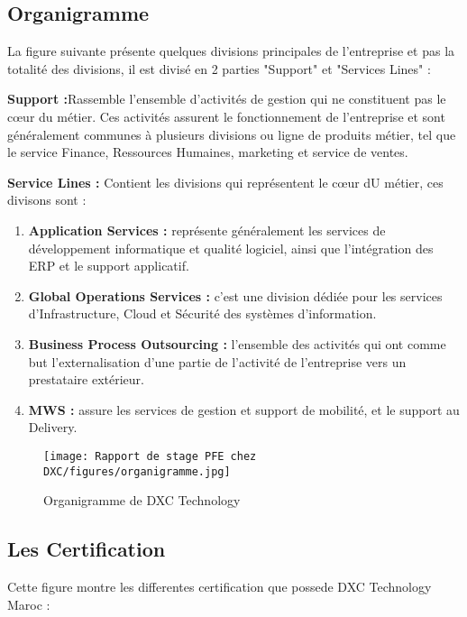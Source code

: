 \newpage
\subsection{Organigramme }
La figure suivante présente quelques divisions principales de l’entreprise et pas la totalité
des divisions, il est divisé en 2 parties "Support" et "Services Lines" :

\begin{description}
  \item \textbf{Support :}Rassemble l’ensemble d'activités de gestion qui ne constituent pas le cœur du métier. Ces activités assurent le fonctionnement de l'entreprise et sont généralement communes à plusieurs divisions ou ligne de produits métier, tel que le service Finance, Ressources Humaines, marketing et service de ventes.
  \item \textbf{Service Lines :} Contient les divisions qui représentent le cœur dU métier, ces divisons
 sont :
 \begin{enumerate}
   \item \textbf{Application Services :} représente généralement les services de développement informatique et qualité logiciel, ainsi que l’intégration des ERP et le support applicatif.
   \item \textbf{Global Operations Services :} c’est une division dédiée pour les services d’Infrastructure, Cloud et Sécurité des systèmes d’information.
   \item \textbf{Business Process Outsourcing : } l’ensemble des activités qui ont comme but l'externalisation d'une partie de l'activité de l'entreprise vers un prestataire extérieur.
    \item \textbf{MWS  : } assure les services de gestion et support de mobilité, et le support au Delivery.
 \end{enumerate}
  
  \begin{figure}[!h]
    \centering
    \texttt{[image: Rapport de stage PFE chez DXC/figures/organigramme.jpg]}
    \caption{Organigramme de DXC Technology}
\end{figure}
  
\end{description}

\subsection{Les Certification }

Cette figure montre les differentes certification que possede DXC Technology Maroc : 


